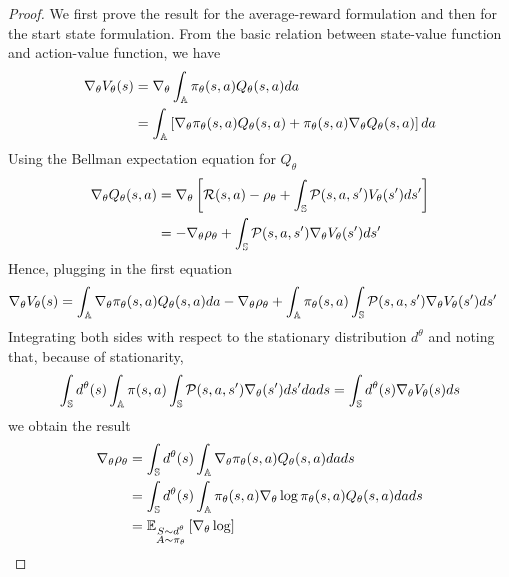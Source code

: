 \begin{proof}
	We first prove the result for the average-reward formulation and then for the start state formulation. From the basic relation between state-value function and action-value function, we have
	\begin{equation*}
		\begin{split}
			\nabla_\theta V_\theta(s) &= \nabla_\theta \int_{\A} \pi_\theta(s,a) Q_\theta(s,a) da\\
				&= \int_{\A} \left[ \nabla_\theta \pi_\theta(s,a) Q_\theta(s,a) + \pi_\theta(s,a) \nabla_\theta Q_\theta(s,a)\right] da
		\end{split}
	\end{equation*} 
	Using the Bellman expectation equation for $Q_\theta$ 
	\begin{equation*}
		\begin{split}
			\nabla_\theta Q_\theta(s,a) &= \nabla_\theta \left[ \calR(s,a) - \rho_\theta + \int_{\S} \calP(s,a,s') V_\theta(s') ds' \right]\\
			&= -\nabla_\theta \rho_\theta + \int_{\S} \calP(s,a,s') \nabla_\theta V_\theta(s') ds'
		\end{split}
	\end{equation*}
	Hence, plugging in the first equation 
	\begin{equation*}
		\begin{split}
			\nabla_\theta V_\theta(s) &= \int_{\A} \nabla_\theta \pi_\theta(s,a) Q_\theta(s,a) da - \nabla_\theta \rho_\theta + \int_\A \pi_\theta(s,a) \int_{\S} \calP(s,a,s') \nabla_\theta V_\theta(s') ds' 
		\end{split}
	\end{equation*} 	
	Integrating both sides with respect to the stationary distribution $d^\theta$ and noting that, because of stationarity,  
	\begin{equation*}
		\int_{\S} d^\theta(s) \int_{\A} \pi(s,a) \int_{\S} \calP(s,a,s') \nabla_\theta(s') ds' da ds = \int_{\S} d^\theta(s) \nabla_\theta V_\theta(s) ds
	\end{equation*}
	we obtain the result 
	\begin{equation*}
		\begin{split}
		\nabla_\theta \rho_\theta &= \int_{\S} d^\theta(s) \int_{\A} \nabla_\theta \pi_\theta(s,a) Q_\theta(s,a) da ds\\
		&= \int_{\S} d^\theta(s) \int_{\A} \pi_\theta(s,a) \nabla_\theta \log\pi_\theta(s,a) Q_\theta(s,a) da ds\\
		&= \E[\substack{S \sim d^\theta\\A \sim \pi_\theta}]{\nabla_\theta\log
}
\end{split}
\end{equation*}
\end{proof}
